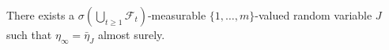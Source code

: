 There exists a \(\sigma(\bigcup_{t\ge1}\mathcal F_t)\)-measurable \(\{1,\ldots,m\}\)-valued random variable \(J\) such that \(\eta_\infty=\bar\eta_J\) almost surely.